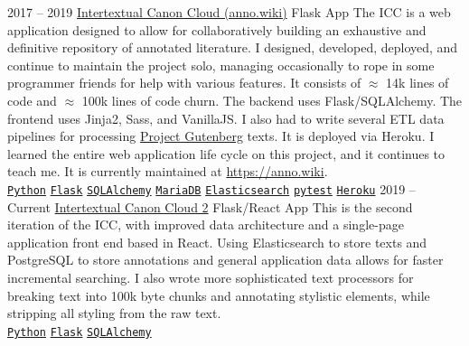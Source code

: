 \documentclass[9pt]{developercv} %
\begin{document}
\begin{entrylist}
    \entry
        {2017 -- 2019}
        {{\href{https://github.com/Anno-Wiki/icc}{Intertextual Canon Cloud (anno.wiki)}}}
        {Flask App}
        {The ICC is a web application designed to allow for collaboratively
        building an exhaustive and definitive repository of annotated
        literature. I designed, developed, deployed, and continue to maintain
        the project solo, managing occasionally to rope in some programmer
        friends for help with various features. It consists of $\approx$ 14k
        lines of code and $\approx$ 100k lines of code churn. The backend uses
        Flask/SQLAlchemy. The frontend uses Jinja2, Sass, and VanillaJS. I also
        had to write several ETL data pipelines for processing
        {\href{https://gutenberg.org}{Project Gutenberg}} texts. It is deployed
        via Heroku. I learned the entire web application life cycle on this
        project, and it continues to teach me. It is currently maintained at
        {\href{https://anno.wiki}{https://anno.wiki}}.
        \\
        \texttt{{\href{https://www.python.org/}{Python}}}\slashsep
        \texttt{{\href{https://flask.palletsprojects.com/en/1.1.x/}{Flask}}}\slashsep
        \texttt{{\href{https://www.sqlalchemy.org/}{SQLAlchemy}}}\slashsep
        \texttt{{\href{https://mariadb.org/}{MariaDB}}}\slashsep
        \texttt{{\href{https://www.elastic.co/}{Elasticsearch}}}\slashsep
        \texttt{{\href{https://docs.pytest.org/en/stable/}{pytest}}}\slashsep
        \texttt{{\href{https://www.heroku.com/}{Heroku}}}
        }
    \entry
        {2019 -- Current}
        {{\href{https://github.com/Anno-Wiki}{Intertextual Canon Cloud 2}}}
        {Flask/React App}
        {
            This is the second iteration of the ICC, with improved data
            architecture and a single-page application front end based in React.
            Using Elasticsearch to store texts and PostgreSQL to store
            annotations and general application data allows for faster
            incremental searching. I also wrote more sophisticated text
            processors for breaking text into 100k byte chunks and annotating
            stylistic elements, while stripping all styling from the raw text.
        \\
        \texttt{{\href{https://www.python.org/}{Python}}}\slashsep
        \texttt{{\href{https://flask.palletsprojects.com/en/1.1.x/}{Flask}}}\slashsep
        \texttt{{\href{https://www.sqlalchemy.org/}{SQLAlchemy}}}\slashsep
}
\end{entrylist}
\end{document}
